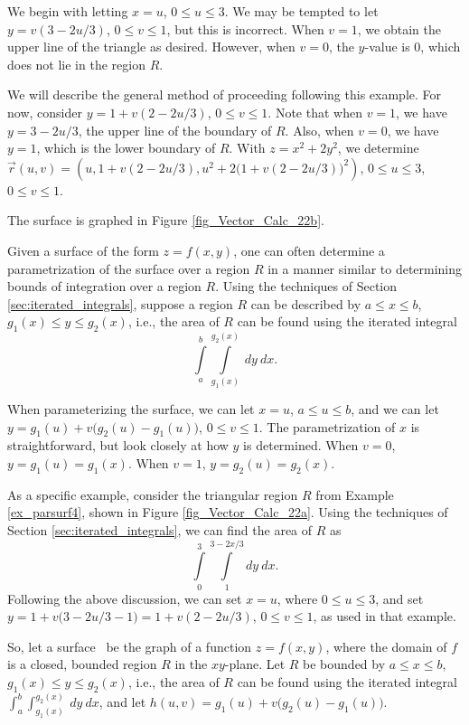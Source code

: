 \begin{example}
We begin with letting $x=u$, $0\leq u\leq 3$. We may be tempted to let $y = v(3-2u/3)$, $0\leq v\leq 1$, but this is incorrect. When $v = 1$, we obtain the upper line of the triangle as desired. However, when $v=0$, the $y$-value is 0, which does not lie in the region $R$. 


We will describe the general method of proceeding following this example. For now, consider $y = 1+v(2-2u/3)$, $0\leq v\leq 1$. Note that when $v=1$, we have $y=3-2u/3$, the upper line of the boundary of $R$. Also, when $v=0$, we have $y=1$, which is the lower boundary of $R$. With $z=x^2+2y^2$, we determine $\vec r(u,v) = \left( u, 1+v(2-2u/3), u^2+2\big(1+v(2-2u/3)\big)^2\right)$, $0\leq u\leq 3$, $0\leq v\leq 1$. 

The surface is graphed in Figure \ref{fig_Vector_Calc_22b}.
\end{example}


Given a surface of the form $z=f(x,y)$, one can often determine a parametrization of the surface over a region $R$ in a manner similar to determining bounds of integration over a region $R$. Using the techniques of Section \ref{sec:iterated_integrals}, suppose a region $R$ can be described by $a\leq x\leq b$, $g_1(x) \leq y\leq g_2(x)$, i.e., the area of $R$ can be found using the iterated integral
$$\int\limits_a^b\int\limits_{g_1(x)}^{g_2(x)}\ dy\ dx.$$

When parameterizing the surface, we can let $x=u$, $a\leq u\leq b$, and we can let \\ $y = g_1(u)+v\big(g_2(u)-g_1(u)\big)$, $0\leq v\leq 1$. The parametrization of $x$ is straightforward, but look closely at how $y$ is determined. When $v=0$, $y=g_1(u) = g_1(x)$. When $v=1$, $y= g_2(u)=g_2(x)$. 


 As a specific example, consider the triangular region $R$ from Example \ref{ex_parsurf4}, shown in Figure \ref{fig_Vector_Calc_22a}. Using the techniques of Section \ref{sec:iterated_integrals}, we can find the area of $R$ as
$$\int\limits_0^3\int\limits_1^{3-2x/3} dy\ dx.$$
Following the above discussion, we can set $x=u$, where $0\leq u\leq 3$, and set \\ $y = 1+ v\big(3-2u/3-1\big) = 1+v(2-2u/3)$, $0\leq v\leq 1$, as used in that example.

 So, let a surface \surfaceS\ be the graph of a function $z=f(x,y)$, where the domain of $f$ is  a closed, bounded region $R$ in the $xy$-plane. 
Let $R$ be bounded by $a\leq x\leq b$, $g_1(x)\leq y\leq g_2(x)$, i.e., the area of $R$ can be found using the iterated integral $\int_a^b\int_{g_1(x)}^{g_2(x)}\ dy\ dx$, and let $h(u,v) = g_1(u)+v\big(g_2(u)-g_1(u)\big)$. 


